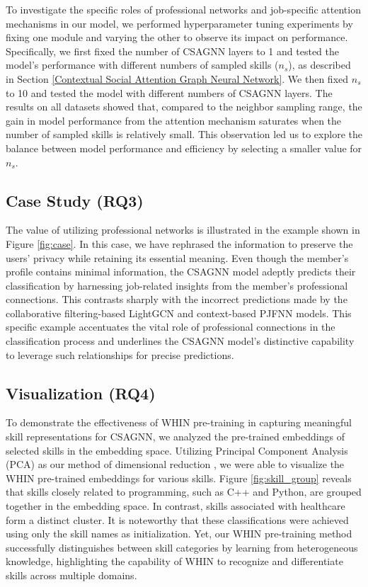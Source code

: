 To investigate the specific roles of professional networks and job-specific attention mechanisms in our model, we performed hyperparameter tuning experiments by fixing one module and varying the other to observe its impact on performance. Specifically, we first fixed the number of CSAGNN layers to 1 and tested the model's performance with different numbers of sampled skills ($n_s$), as described in Section \ref{Contextual Social Attention Graph Neural Network}. We then fixed $n_s$ to 10 and tested the model with different numbers of CSAGNN layers. The results on all datasets showed that, compared to the neighbor sampling range, the gain in model performance from the attention mechanism saturates when the number of sampled skills is relatively small. This observation led us to explore the balance between model performance and efficiency by selecting a smaller value for $n_s$.

\subsection{Case Study (RQ3)}
The value of utilizing professional networks is illustrated in the example shown in Figure \ref{fig:case}. In this case, we have rephrased the information to preserve the users' privacy while retaining its essential meaning. Even though the member's profile contains minimal information, the CSAGNN model adeptly predicts their classification by harnessing job-related insights from the member's professional connections. This contrasts sharply with the incorrect predictions made by the collaborative filtering-based LightGCN and context-based PJFNN models. This specific example accentuates the vital role of professional connections in the classification process and underlines the CSAGNN model's distinctive capability to leverage such relationships for precise predictions.


\subsection{Visualization (RQ4)}
To demonstrate the effectiveness of WHIN pre-training in capturing meaningful skill representations for CSAGNN, we analyzed the pre-trained embeddings of selected skills in the embedding space. Utilizing Principal Component Analysis (PCA) as our method of dimensional reduction \cite{jolliffe2016principal}, we were able to visualize the WHIN pre-trained embeddings for various skills. Figure \ref{fig:skill_group} reveals that skills closely related to programming, such as C++ and Python, are grouped together in the embedding space. In contrast, skills associated with healthcare form a distinct cluster. It is noteworthy that these classifications were achieved using only the skill names as initialization. Yet, our WHIN pre-training method successfully distinguishes between skill categories by learning from heterogeneous knowledge, highlighting the capability of WHIN to recognize and differentiate skills across multiple domains.
